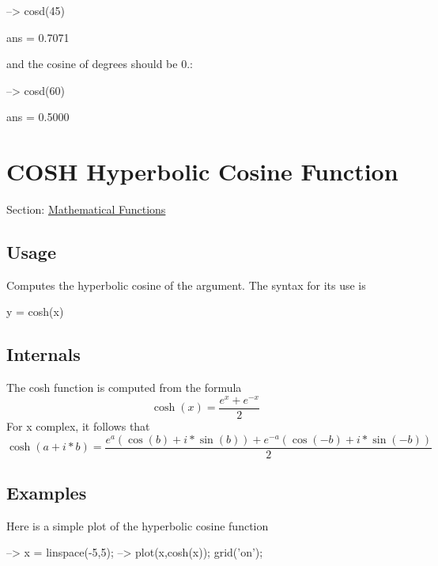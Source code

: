\begin{DoxyVerbInclude}
--> cosd(45)

ans = 
    0.7071 
\end{DoxyVerbInclude}


and the cosine of {} degrees should be 0.\-:


\begin{DoxyVerbInclude}
--> cosd(60)

ans = 
    0.5000 
\end{DoxyVerbInclude}
 \hypertarget{mathfunctions_cosh}{}\section{C\-O\-S\-H Hyperbolic Cosine Function}\label{mathfunctions_cosh}
Section\-: \hyperlink{sec_mathfunctions}{Mathematical Functions} \hypertarget{vtkwidgets_vtkxyplotwidget_Usage}{}\subsection{Usage}\label{vtkwidgets_vtkxyplotwidget_Usage}
Computes the hyperbolic cosine of the argument. The syntax for its use is \begin{DoxyVerb}   y = cosh(x)
\end{DoxyVerb}
 \hypertarget{transforms_svd_Function}{}\subsection{Internals}\label{transforms_svd_Function}
The {\ttfamily cosh} function is computed from the formula \[ \cosh(x) = \frac{e^x+e^{-x}}{2} \] For {\ttfamily x} complex, it follows that \[ \cosh(a+i*b) = \frac{e^a(\cos(b)+i*\sin(b)) + e^{-a}(\cos(-b)+i*\sin(-b))}{2} \] \hypertarget{variables_matrix_Examples}{}\subsection{Examples}\label{variables_matrix_Examples}
Here is a simple plot of the hyperbolic cosine function


\begin{DoxyVerbInclude}
--> x = linspace(-5,5);
--> plot(x,cosh(x)); grid('on');
\end{DoxyVerbInclude}


